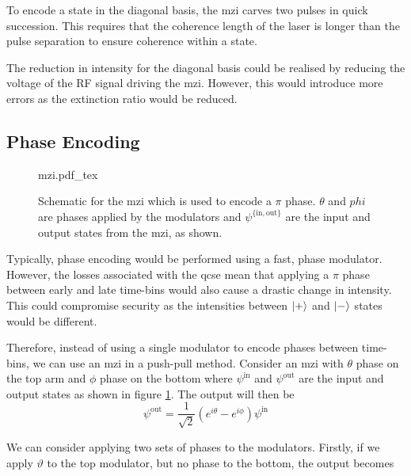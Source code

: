 
To encode a state in the diagonal basis, the \ac{mzi} carves two pulses in quick succession. This requires that the coherence length of the laser is longer than the pulse separation to ensure coherence within a state. 

The reduction in intensity for the diagonal basis could be realised by reducing the voltage of the RF signal driving the \ac{mzi}. However, this would introduce more errors as the extinction ratio would be reduced.

\subsection{Phase Encoding}
\label{sec:phase_encoding}
\begin{figure}[t]
	\centering
	\small
	\def\svgwidth{0.6\textwidth} 
	{mzi.pdf_tex}
	\caption[MZI schematic for $\pi$ phase encoding]{Schematic for the \acs{mzi} which is used to encode a $\pi$ phase. $\theta$ and $phi$ are phases applied by the modulators and $\psi^{\{\mathrm{in},\mathrm{out}\}}$ are the input and output states from the \ac{mzi}, as shown.}
	\label{fig:mzi_pi_phase}
\end{figure}

Typically, phase encoding would be performed using a fast, phase modulator. However, the losses associated with the \ac{qcse} mean that applying a $\pi$ phase between early and late time-bins would also cause a drastic change in intensity. This could compromise security as the intensities between $\ket{+}$ and $\ket{-}$ states would be different.

\begin{parahigh}
Therefore, instead of using a single modulator to encode phases between time-bins, we can use an \ac{mzi} in a push-pull method. Consider an \ac{mzi} with $\theta$ phase on the top arm and $\phi$ phase on the bottom where $\psi^\mathrm{in}$ and $\psi^\mathrm{out}$ are the input and output states as shown in figure \ref{fig:mzi_pi_phase}. The output will then be 
\begin{equation}
	\psi^\mathrm{out} =  \frac{1}{\sqrt{2}}\left(e^{i\theta} - e^{i\phi}\right) \psi^\mathrm{in}
\end{equation}
\end{parahigh}

We can consider applying two sets of phases to the modulators. Firstly, if we apply $\vartheta$ to the top modulator, but no phase to the bottom, the output becomes

